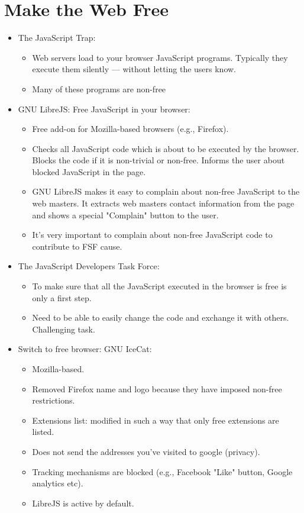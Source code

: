 \documentclass[twoside,openright]{report}
\newcommand{\addnom}[2]{\nomenclature{#1}{#2}}
\begin{document}
\section{Make the Web Free}
\begin{itemize}
\item    The JavaScript Trap:
\begin{itemize}
 \item        Web servers load to your browser JavaScript programs. Typically they execute them silently --- without letting the users know.
 \item        Many of these programs are non-free
\end{itemize}
 \item    GNU LibreJS: Free JavaScript in your browser:
\addnom{JS}{JavaScript}
\begin{itemize}
 \item        Free add-on for Mozilla-based browsers (e.g., Firefox).
 \item        Checks all JavaScript code which is about to be executed by the browser. Blocks the code if it is non-trivial or non-free. Informs the user about blocked JavaScript in the page.
 \item        GNU LibreJS makes it easy to complain about non-free JavaScript to the web masters. It extracts web masters contact information from the page and shows a special "Complain" button to the user.
 \item        It's very important to complain about non-free JavaScript code to contribute to FSF cause.
\end{itemize}
 \item    The JavaScript Developers Task Force:
\begin{itemize}
 \item        To make sure that all the JavaScript executed in the browser is free is only a first step.
 \item        Need to be able to easily change the code and exchange it with others. Challenging task.
\end{itemize}
 \item    Switch to free browser: GNU IceCat:
\begin{itemize}
 \item        Mozilla-based.
 \item        Removed Firefox name and logo because they have imposed non-free restrictions.
 \item        Extensions list: modified in such a way that only free extensions are listed.
 \item        Does not send the addresses you've visited to google (privacy).
 \item        Tracking mechanisms are blocked (e.g., Facebook "Like" button, Google analytics etc).
 \item        LibreJS is active by default.
\end{itemize}
\end{itemize}
\end{document}
